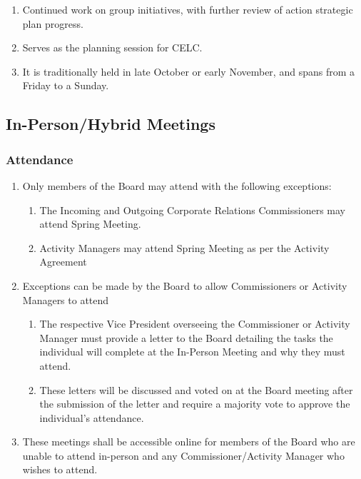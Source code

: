 \begin{enumerate}
 \item
  Continued work on group initiatives, with further review of action strategic plan progress.
 \item
  Serves as the planning session for CELC.
 \item
  It is traditionally held in late October or early November, and spans from a Friday to a Sunday.
\end{enumerate}

\subsection{In-Person/Hybrid Meetings}
\label{in-personhybrid-meetings}

\subsubsection{Attendance}
\label{attendance-1}

\begin{enumerate}
 \item
  Only members of the Board may attend with the following exceptions:

  \begin{enumerate}
   \item
    The Incoming and Outgoing Corporate Relations Commissioners may attend Spring Meeting.
   \item
    Activity Managers may attend Spring Meeting as per the Activity Agreement
  \end{enumerate}
 \item
  Exceptions can be made by the Board to allow Commissioners or Activity Managers to attend

  \begin{enumerate}
   \item
    The respective Vice President overseeing the Commissioner or Activity Manager must provide a letter to the Board detailing the tasks the individual will complete at the In-Person Meeting and why they must attend.
   \item
    These letters will be discussed and voted on at the Board meeting after the submission of the letter and require a majority vote to approve the individual's attendance.
  \end{enumerate}
 \item
  These meetings shall be accessible online for members of the Board who are unable to attend in-person and any Commissioner/Activity Manager who wishes to attend.
\end{enumerate}

